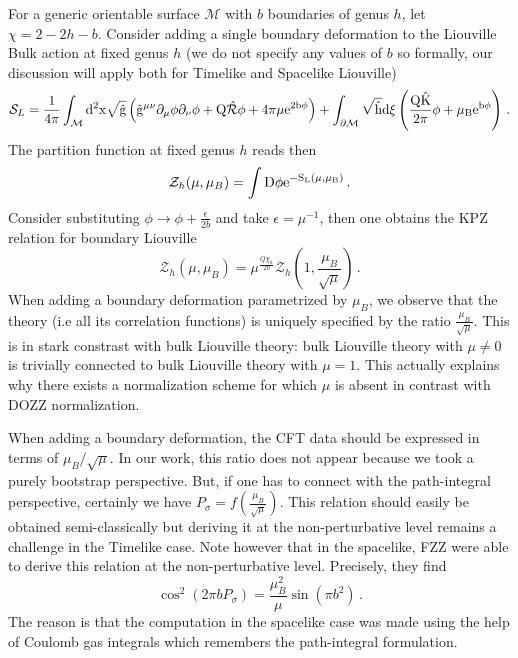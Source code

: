 \documentclass[a4paper]{article}
\begin{document}
For a generic orientable surface $\mathcal{M}$ with $b$ boundaries of genus $h$, let $\chi = 2 -2h -b$. Consider adding a single boundary deformation to the Liouville Bulk action at fixed genus $h$ (we do not specify any values of $b$ so formally, our discussion will apply both for Timelike and Spacelike Liouville)
\begin{equation}
  \mathcal{S}_L = \frac{1}{4\pi}\int_{\mathcal{M}} \rm{d}^2 x \sqrt{\hat{g}}\left(\hat{g}^{\mu \nu}\partial_\mu \phi \partial_\nu \phi + Q \hat{\mathcal{R}} \phi + 4\pi \mu e^{2 b\phi}\right) +  \int_{\partial \mathcal{M}}  \sqrt{\hat{h}}\rm{d}\xi  \left(\frac{Q \hat{K}}{2\pi} \phi + \mu_B e^{b \phi}\right)\,.
\end{equation}
The partition function at fixed genus $h$ reads then
\begin{equation}
  \mathcal{Z}_h(\mu,\mu_B) = \int \rm{D}\phi e^{-S_L(\mu,\mu_B)}\,.
\end{equation}
Consider substituting $\phi \to \phi + \frac{\epsilon}{2 b}$ and take $\epsilon = \mu^{-1}$, then one obtains the KPZ relation for boundary Liouville
\begin{equation}
  \mathcal{Z}_h(\mu,\mu_B) = \mu^{\frac{Q\chi_h}{2b}}\mathcal{Z}_h\left(1,\frac{\mu_B}{\sqrt{\mu}}\right)\,.
\end{equation}
When adding a boundary deformation parametrized by $\mu_B$, we observe that the theory (i.e all its correlation functions) is uniquely specified by the ratio $\frac{\mu_B}{\sqrt{\mu}}$. This is in stark constrast with bulk Liouville theory: bulk Liouville theory with $\mu \neq 0$ is trivially connected to bulk Liouville theory with $\mu =1$. This actually explains why there exists a normalization scheme for which $\mu$ is absent in contrast with DOZZ normalization.

When adding a boundary deformation, the CFT data should be expressed in terms of $\mu_B / \sqrt{\mu}$. In our work, this ratio does not appear because we took a purely bootstrap perspective. But, if one has to connect with the path-integral perspective, certainly we have $P_{\sigma} = f\left(\frac{\mu_B}{\sqrt{\mu}}\right)$. This relation should easily be obtained semi-classically but deriving it at the non-perturbative level remains a challenge in the Timelike case. Note however that in the spacelike, FZZ were able to derive this relation at the non-perturbative level. Precisely, they find
\begin{equation}
  \cos^2\left(2\pi b P_{\sigma}\right) = \frac{\mu_B^2}{\mu}\sin\left(\pi b^2\right)\,.
\end{equation}
The reason is that the computation in the spacelike case was made using the help of Coulomb gas integrals which remembers the path-integral formulation.
\end{document}
